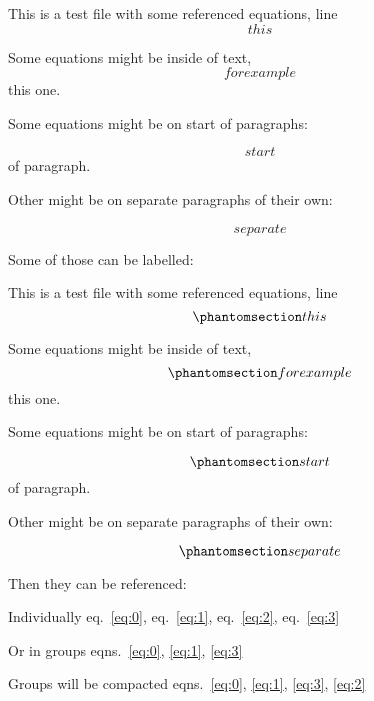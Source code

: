 This is a test file with some referenced equations, line \[ this \]

Some equations might be inside of text, \[ for example \] this one.

Some equations might be on start of paragraphs:

\[ start \] of paragraph.

Other might be on separate paragraphs of their own:

\[ separate \]

Some of those can be labelled:

This is a test file with some referenced equations, line
\begin{equation}\phantomsection\label{eq:0}{ this }\end{equation}

Some equations might be inside of text,
\begin{equation}\phantomsection\label{eq:1}{ for example }\end{equation}
this one.

Some equations might be on start of paragraphs:

\begin{equation}\phantomsection\label{eq:2}{ start }\end{equation} of
paragraph.

Other might be on separate paragraphs of their own:

\begin{equation}\phantomsection\label{eq:3}{ separate }\end{equation}

Then they can be referenced:

Individually eq.~\ref{eq:0}, eq.~\ref{eq:1}, eq.~\ref{eq:2},
eq.~\ref{eq:3}

Or in groups eqns.~\ref{eq:0}, \ref{eq:1}, \ref{eq:3}

Groups will be compacted
eqns.~\ref{eq:0}, \ref{eq:1}, \ref{eq:3}, \ref{eq:2}

